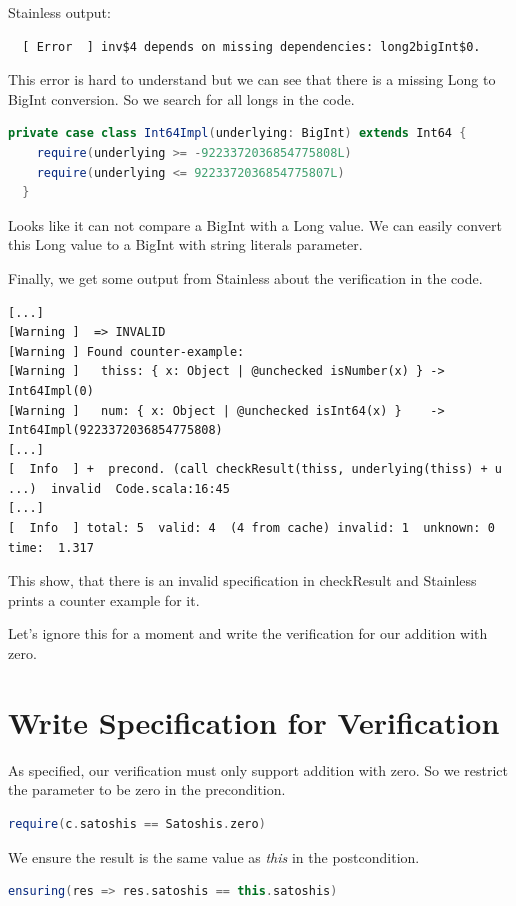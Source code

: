 Stainless output:
{\footnotesize\begin{verbatim}
  [ Error  ] inv$4 depends on missing dependencies: long2bigInt$0.
\end{verbatim}}

This error is hard to understand but we can see that there is a missing Long to BigInt conversion.
So we search for all longs in the code.
\begin{lstlisting}[language=scala]
  private case class Int64Impl(underlying: BigInt) extends Int64 {
    require(underlying >= -9223372036854775808L)
    require(underlying <= 9223372036854775807L)
  }
\end{lstlisting}

Looks like it can not compare a BigInt with a Long value.
We can easily convert this Long value to a BigInt with string literals parameter.

Finally, we get some output from Stainless about the verification in the code.
{\footnotesize\begin{verbatim}
[...]
[Warning ]  => INVALID
[Warning ] Found counter-example:
[Warning ]   thiss: { x: Object | @unchecked isNumber(x) } -> Int64Impl(0)
[Warning ]   num: { x: Object | @unchecked isInt64(x) }    -> Int64Impl(9223372036854775808)
[...]
[  Info  ] +  precond. (call checkResult(thiss, underlying(thiss) + u ...)  invalid  Code.scala:16:45
[...]
[  Info  ] total: 5  valid: 4  (4 from cache) invalid: 1  unknown: 0  time:  1.317
\end{verbatim}}

This show, that there is an invalid specification in checkResult and Stainless prints a counter example for it.

Let's ignore this for a moment and write the verification for our addition with zero.


\section{Write Specification for Verification}

As specified, our verification must only support addition with zero.
So we restrict the parameter to be zero in the precondition.
\begin{lstlisting}[language=scala]
  require(c.satoshis == Satoshis.zero)
\end{lstlisting}

We ensure the result is the same value as \emph{this} in the postcondition.
\begin{lstlisting}[language=scala]
  ensuring(res => res.satoshis == this.satoshis)
\end{lstlisting}

